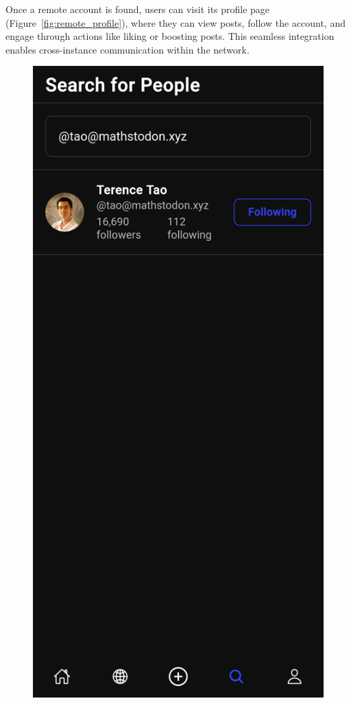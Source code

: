 Once a remote account is found, users can visit its profile page (Figure~\ref{fig:remote_profile}), where they can view posts, follow the account, and engage through actions like liking or boosting posts. This seamless integration enables cross-instance communication within the network.
\begin{figure}[htbp]
  \centering
  \begin{minipage}[b]{0.45\linewidth}
    \centering
    \includegraphics[width=\linewidth]{Graphics/remoteaccountsearchfollow.png}

\end{minipage}
\end{figure}
